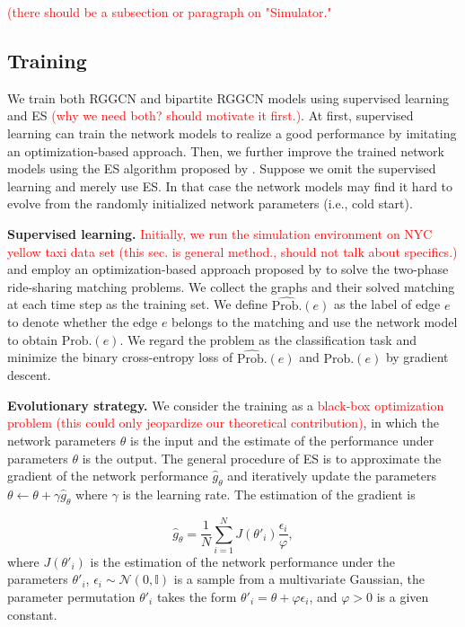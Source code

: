 \documentclass[sigconf]{acmart}
\newcommand{\tcr}[1]{{\textcolor{red}{#1}}}
\begin{document}
\tcr{(there should be a subsection or paragraph on "Simulator."}

\subsection{Training}

We train both RGGCN and bipartite RGGCN models using supervised learning
and ES \tcr{(why we need both? should motivate it first.)}. 
At first, supervised learning can train the network models
to realize a good performance by imitating an optimization-based approach.
Then, we further improve the trained network models using the ES algorithm
proposed by \cite{salimans2017evolution}. Suppose we omit the supervised
learning and merely use ES. In that case the network models may find
it hard to evolve from the randomly initialized network parameters (i.e., cold start).

\textbf{Supervised learning.} 
\tcr{Initially, we run the simulation environment
on NYC yellow taxi data set \cite{nycwebsite} (this sec. is general method., should not talk about specifics.)} and employ an optimization-based
approach proposed by \cite{danassis2019putting} to solve the two-phase
ride-sharing matching problems. We collect the graphs and their solved
matching at each time step as the training set. We define $\hat{\text{Prob.}}(e)$
as the label of edge $e$ to denote whether the edge $e$ belongs
to the matching and use the network model to obtain $\text{Prob.}(e)$.
We regard the problem as the classification task and minimize the
binary cross-entropy loss of $\hat{\text{Prob.}}(e)$ and $\text{Prob.}(e)$
by gradient descent.

\textbf{Evolutionary strategy.} We consider the training as a \tcr{black-box
optimization problem (this could only jeopardize our theoretical contribution)}, in which the network parameters $\theta$ is
the input and the estimate of the performance under parameters $\theta$
is the output. The general procedure of ES is to approximate the gradient
of the network performance $\hat{g}_{\theta}$ and iteratively update
the parameters $\theta\leftarrow\theta+\gamma\hat{g}_{\theta}$ where
$\gamma$ is the learning rate. The estimation of the gradient is 

\[
\hat{g}_{\theta}=\frac{1}{N}\sum_{i=1}^{N}J(\theta'_{i})\frac{\epsilon_{i}}{\varphi},
\]
where $J(\theta'_{i})$ is the estimation of the network performance
under the parameters $\theta'_{i}$, $\epsilon_{i}\sim\mathcal{N}(0,\mathbb{I})$
is a sample from a multivariate Gaussian, the parameter permutation
$\theta'_{i}$ takes the form $\theta'_{i}=\theta+\varphi\epsilon_{i}$,
and $\varphi>0$ is a given constant.
\end{document}
